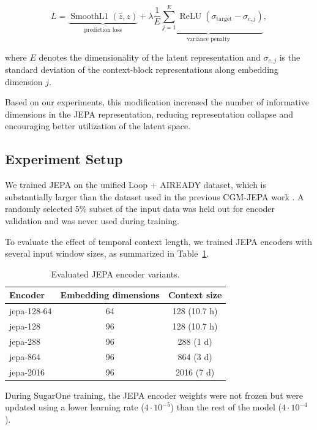 \documentclass[11pt,a4paper]{article}
\begin{document}
$$
L =
\underbrace{
\operatorname{SmoothL1}(\hat{z},z)
}_{\text{prediction loss}}
+
\lambda
\underbrace{
\frac{1}{E}
\sum_{j=1}^{E}
\operatorname{ReLU}
\left(
\sigma_{\mathrm{target}} -
\sigma_{c,j}
\right)
}_{\text{variance penalty}},
$$

where $E$ denotes the dimensionality of the latent representation and $\sigma_{c,j}$ is the standard deviation of the context-block representations along embedding dimension $j$.

Based on our experiments, this modification increased the number of informative dimensions in the JEPA representation, reducing representation collapse and encouraging better utilization of the latent space.

\subsection{Experiment Setup}

We trained JEPA on the unified Loop + AIREADY dataset, which is substantially larger than the dataset used in the previous CGM-JEPA work \cite{muhammad2026cgm}. A randomly selected 5\% subset of the input data was held out for encoder validation and was never used during training.

To evaluate the effect of temporal context length, we trained JEPA encoders with several input window sizes, as summarized in Table~\ref{tab:model_comparison}.

\begin{table}[ht]
    \centering
    \begin{tabular}{lcc}
        \hline
        Encoder & Embedding dimensions & Context size \\
        \hline
        jepa-128-64 & 64 & 128 (10.7 h) \\
        jepa-128 & 96 & 128 (10.7 h) \\
        jepa-288 & 96 & 288 (1 d) \\
        jepa-864 & 96 & 864 (3 d) \\
        jepa-2016 & 96 & 2016 (7 d) \\
        \hline
    \end{tabular}
    \caption{Evaluated JEPA encoder variants.}
    \label{tab:model_comparison}
\end{table}

During SugarOne training, the JEPA encoder weights were not frozen but were updated using a lower learning rate ($4 \cdot 10^{-5}$) than the rest of the model ($4 \cdot 10^{-4}$).
\end{document}
